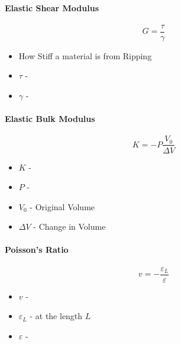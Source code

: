 			\paragraph{Elastic Shear Modulus} \label{par:Elastic Shear Modulus}
				\begin{equation} \label{eq:Elastic Shear Modulus}
					G = \frac{\tau}{\gamma}
				\end{equation}
				\begin{itemize}[noitemsep]
					\item How Stiff a material is from Ripping
					\item $\tau$ - 
					\item $\gamma$ - 
				\end{itemize}
			
			\paragraph{Elastic Bulk Modulus} \label{par:Elastic Bulk Modulus}
				\begin{equation} \label{eq:Elastic Bulk Modulus}
					K = -P \frac{V_{0}}{\Delta V}
				\end{equation}
				\begin{itemize}[noitemsep]
					\item $K$ - 
					\item $P$ - 
					\item $V_{0}$ - Original Volume
					\item $\Delta V$ - Change in Volume
				\end{itemize}
					
			\paragraph{Poisson's Ratio} \label{par:Poissons Ratio}
				\begin{equation}
					v = -\frac{\varepsilon_{L}}{\varepsilon}
				\end{equation}
				\begin{itemize}[noitemsep]
					\item $v$ - 
					\item $\varepsilon_{L}$ -  at the length $L$
					\item $\varepsilon$ - 
				\end{itemize}
			

